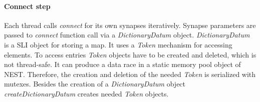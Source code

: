 \paragraph{Connect step}
Each thread calls \emph{connect} for its own synapses iteratively.
Synapse parameters are passed to \emph{connect} function call via a \emph{DictionaryDatum} object.
\emph{DictionaryDatum} is a SLI object for storing a map.
It uses a \emph{Token} mechanism for accessing elements.
To access entries \emph{Token} objects have to be created and deleted,
which is not thread-safe. It can produce a data race in a static memory pool object of NEST.
Therefore, the creation and deletion of the needed \emph{Token} is serialized with mutexes.
Besides the creation of a \emph{DictionaryDatum} object \emph{createDictionaryDatum} creates needed \emph{Token} objects.

